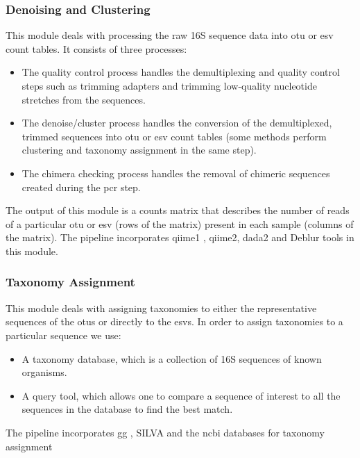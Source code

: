     \subsubsection*{Denoising and Clustering}
      \vspace{-5mm}
      This module deals with processing the raw 16S sequence data into \ac{otu} or \ac{esv} count tables.
      It consists of three processes:
      \begin{itemize}
        \item The quality control process handles the demultiplexing and quality control steps such as trimming adapters and trimming low-quality nucleotide stretches from the sequences.
        \item The denoise/cluster process handles the conversion of the demultiplexed, trimmed sequences into \ac{otu} or \ac{esv} count tables (some methods perform clustering and taxonomy assignment in the same step).
        \item The chimera checking process handles the removal of chimeric sequences created during the \ac{pcr} step.
      \end{itemize}
      The output of this module is a counts matrix that describes the number of reads of a particular \ac{otu} or \ac{esv} (rows of the matrix) present in each sample (columns of the matrix). The pipeline incorporates \ac{qiime1} \cite{Caporaso2010}, \ac{qiime2}, \ac{dada2} \cite{Callahan2016} and Deblur \cite{Amir2017} tools in this module.

    \subsubsection*{Taxonomy Assignment}
      \vspace{-5mm}
      This module deals with assigning taxonomies to either the representative sequences of the \ac{otu}s or directly to the \ac{esv}s.
      In order to assign taxonomies to a particular sequence we use:
      \begin{itemize}
        \item A taxonomy database, which is a collection of 16S sequences of known organisms.
        \item A query tool, which allows one to compare a sequence of interest to all the sequences in the database to find the best match.
      \end{itemize}
      The pipeline incorporates \ac{gg} \cite{DeSantis2006}, SILVA \cite{Quast2012} and the \ac{ncbi} \cite{Sayers2009} databases for taxonomy assignment

